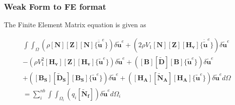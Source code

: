 \documentclass[9pt]{beamer}
\begin{document}
\begin{frame}
\frametitle{Weak Form to FE format}
The Finite Element Matrix equation is given as

\begin{equation*}
\begin{split} 
\int \int_\Omega 
\left(
\rho
\left[ \mathbf{N}  \right]
\left[ \mathbf{Z}  \right]
\left[ \mathbf{N}  \right] 
\{ \ddot{\tilde{\mathbf{u}}}^e \}
\right) 
\delta \tilde{\mathbf{u}}^e
+
\left( 
2 \rho V_1
\left[ \mathbf{N}  \right]
\left[ \mathbf{Z}  \right]
\left[ \mathbf{H_v}  \right] 
\{ \dot{\tilde{\mathbf{u}}}^e \}
\right) 
\delta \tilde{\mathbf{u}}^e \\
-
\left( 
 \rho V_1^2
\left[ \mathbf{H_v}  \right]
\left[ \mathbf{Z}  \right]
\left[ \mathbf{H_v}  \right] 
\{\tilde{\mathbf{u}}^e \}
\right) 
\delta \tilde{\mathbf{u}}^e  
+
\left( 
\left[ \mathbf{B}  \right]
\left[ \mathbf{\tilde{D}}  \right]
\left[ \mathbf{B}  \right] 
\{\tilde{\mathbf{u}}^e \}
\right) 
\delta \tilde{\mathbf{u}}^e  \\
+
\left( 
\left[ \mathbf{B_S}  \right]
\left[ \mathbf{\tilde{D}_S}  \right]
\left[ \mathbf{B_S}  \right] 
\{\tilde{\mathbf{u}}^e \}
\right) 
\delta \tilde{\mathbf{u}}^e
+
\left( 
\left[ \mathbf{H_A}  \right]
\left[ \mathbf{\tilde{N}_A}  \right]
\left[ \mathbf{H_A}  \right] 
\{\tilde{\mathbf{u}}^e \}
\right) 
\delta \tilde{\mathbf{u}}^e
d \Omega
   \\
 =   
 \sum_i^{nb}   \int  \int_{\Omega_i} 
\left(  
 q_i 
\left[ \mathbf{\tilde{N}_f}  \right] 
\right)  
\delta \tilde{\mathbf{u}}^e
  d \Omega_i  
\end{split} 
\end{equation*}

\end{frame}
\end{document}
